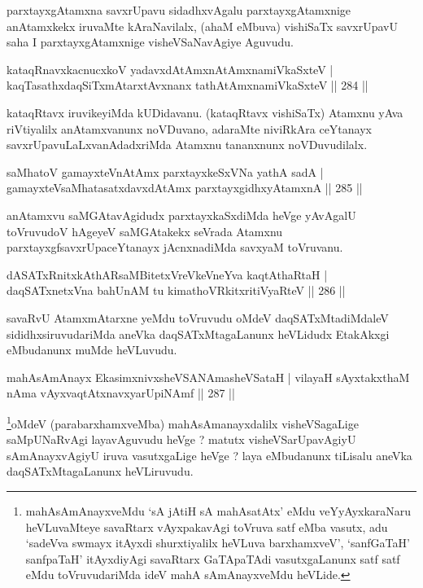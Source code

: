 \begin{artha}
parxtayxgAtamxna savxrUpavu sidadhxvAgalu parxtayxgAtamxnige anAtamxkekx iruvaMte kAraNavilalx, (ahaM eMbuva) vishiSaTx savxrUpavU saha I parxtayxgAtamxnige visheVSaNavAgiye Aguvudu.
\end{artha}

\begin{shl}
kataqRnavxkacnucxkoV yadavxdAtAmx\s nAtAmxnamiVkaSxteV |
kaqTasathxdaqSiTxmAtarxtAvxnanx tathA\s \s tAmxnamiVkaSxteV \hfill || 284 ||
\end{shl}

\begin{artha}
kataqRtavx iruvikeyiMda kUDidavanu. (kataqRtavx vishiSaTx) Atamxnu yAva riVtiyalilx anAtamxvanunx noVDuvano, adaraMte niviRkAra ceYtanayx savxrUpavuLaLxvanAdadxriMda Atamxnu tananxnunx noVDuvudilalx.
\end{artha}

\begin{shl}
saMhatoV gamayxteV\s nAtAmx parxtayxkeSxVNa yathA sadA |
gamayxteV\s saMhatasatxdavxdAtAmx parxtayxgidhxyA\s \s tamxnA \hfill || 285 ||
\end{shl}

\begin{artha}
anAtamxvu saMGAtavAgidudx parxtayxkaSxdiMda heVge yAvAgalU toVruvudoV hAgeyeV saMGAtakekx seVrada Atamxnu parxtayxgfsavxrUpaceYtanayx jAcnxnadiMda savxyaM toVruvanu.
\end{artha}

\begin{shl}
dASATxRnitxkAthARsaMBitetxVreVkeVneYva kaqtAthaRtaH |
daqSATxnetxVna bahUnAM tu kimathoVRkitxritiVyaRteV \hfill || 286 ||
\end{shl}

\begin{artha}
savaRvU AtamxmAtarxne yeMdu toVruvudu oMdeV daqSATxMtadiMdaleV sididhxsiruvudariMda aneVka daqSATxMtagaLanunx heVLidudx EtakAkxgi eMbudanunx muMde heVLuvudu.
\end{artha}

\begin{shl}
mahAsAmAnayx EkasimxnivxsheVSANAmasheVSataH |
vilayaH sAyxtakxthaM nAma vAyxvaqtAtxnavxyarUpiNAmf \hfill || 287 ||
\end{shl}

\begin{artha}
\footnote[1]{mahAsAmAnayxveMdu `sA jAtiH sA mahAsatAtx' eMdu veYyAyxkaraNaru heVLuvaMteye savaRtarx vAyxpakavAgi toVruva satf eMba vasutx, adu `sadeVva swmayx itAyxdi shurxtiyalilx heVLuva barxhamxveV', `sanfGaTaH' sanfpaTaH' itAyxdiyAgi savaRtarx GaTApaTAdi vasutxgaLanunx satf satf eMdu toVruvudariMda ideV mahA sAmAnayxveMdu heVLide.}oMdeV (parabarxhamxveMba) mahAsAmanayxdalilx visheVSagaLige saMpUNaRvAgi layavAguvudu heVge ? matutx visheVSarUpavAgiyU sAmAnayxvAgiyU iruva vasutxgaLige heVge ? laya eMbudanunx tiLisalu aneVka daqSATxMtagaLanunx heVLiruvudu.
\end{artha}

